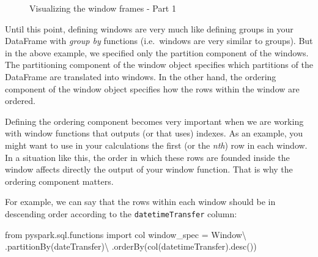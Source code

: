 \documentclass[
  11pt,
  letterpaper,
  DIV=11,
  numbers=noendperiod]{scrreprt}
\newenvironment{Shaded}{\begin{snugshade}}{\end{snugshade}}
\newcommand{\ImportTok}[1]{\textcolor[rgb]{0.00,0.46,0.62}{#1}}
\newcommand{\NormalTok}[1]{\textcolor[rgb]{0.00,0.23,0.31}{#1}}
\newcommand{\OperatorTok}[1]{\textcolor[rgb]{0.37,0.37,0.37}{#1}}
\newcommand{\StringTok}[1]{\textcolor[rgb]{0.13,0.47,0.30}{#1}}
\begin{document}
\begin{figure}


\caption{\label{fig-window-spec1}Visualizing the window frames - Part 1}

\end{figure}%

Until this point, defining windows are very much like defining groups in
your DataFrame with \emph{group by} functions (i.e.~windows are very
similar to groups). But in the above example, we specified only the
partition component of the windows. The partitioning component of the
window object specifies which partitions of the DataFrame are translated
into windows. In the other hand, the ordering component of the window
object specifies how the rows within the window are ordered.

Defining the ordering component becomes very important when we are
working with window functions that outputs (or that uses) indexes. As an
example, you might want to use in your calculations the first (or the
\emph{nth}) row in each window. In a situation like this, the order in
which these rows are founded inside the window affects directly the
output of your window function. That is why the ordering component
matters.

For example, we can say that the rows within each window should be in
descending order according to the \texttt{datetimeTransfer} column:

\begin{Shaded}
\begin{Highlighting}[]
\ImportTok{from}\NormalTok{ pyspark.sql.functions }\ImportTok{import}\NormalTok{ col}
\NormalTok{window\_spec }\OperatorTok{=}\NormalTok{ Window}\OperatorTok{\textbackslash{}}
\NormalTok{    .partitionBy(}\StringTok{\textquotesingle{}dateTransfer\textquotesingle{}}\NormalTok{)}\OperatorTok{\textbackslash{}}
\NormalTok{    .orderBy(col(}\StringTok{\textquotesingle{}datetimeTransfer\textquotesingle{}}\NormalTok{).desc())}
\end{Highlighting}
\end{Shaded}
\end{document}

